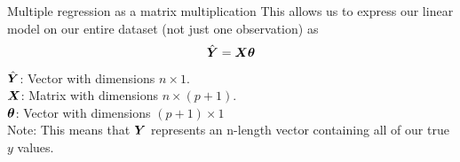 \documentclass[aspectratio=169]{../latex_main/tntbeamer}  %
\begin{document}
	\begin{frame}{Multiple regression as a matrix multiplication}
	    This allows us to express our linear model on our entire dataset (not just one observation) as
	    \begingroup
	    \Large
        \begin{equation*}
            \hat{\bm{Y}} = \bm{X}\bm{\theta}
        \end{equation*}
        \endgroup
        $\hat{\bm{Y}}$: Vector with dimensions $n \times 1$.\\
        $\bm{X}$: Matrix with dimensions $n \times (p + 1)$.\\
        $\bm{\theta}$: Vector with dimensions $(p + 1) \times 1$\\
        \bigskip
        Note: This means that $\bm{Y}$  represents an n-length vector containing all of our true $y$ values.
	\end{frame}
	
\end{document}
